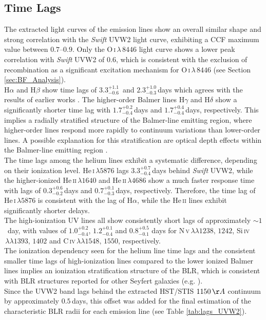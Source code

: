 \subsection{Time Lags}
The extracted light curves of the emission lines show an overall similar shape and strong correlation with the \textit{Swift} UVW2 light curve, exhibiting a CCF maximum value between $0.7$--$0.9$. Only the O\,\textsc{i}\,$\lambda\,8446$ light curve shows a lower peak correlation with \textit{Swift} UVW2 of $0.6$, which is consistent with the exclusion of recombination as a significant excitation mechanism for O\,\textsc{i}\,$\lambda\,8446$ (see Section \ref{sec:BF_Analysis}).\\
H$\alpha$ and H$\beta$ show time lags of $3.3^{+1.1}_{-0.6}\,$ and $2.3^{+1.0}_{-0.3}\,$days which agrees with the results of earlier works \parencite{kollatschny1997balmer, denney2006ngc4593, Williams_2018}. The higher-order Balmer lines H$\gamma$ and H$\delta$ show a significantly shorter time lag with $1.7^{+0.2}_{-0.4}\,$days and $1.7^{+0.4}_{-0.4}\,$days, respectively. This implies a radially stratified structure of the Balmer-line emitting region, where higher-order lines respond more rapidly to continuum variations than lower-order lines. A possible explanation for this stratification are optical depth effects within the Balmer-line emitting region \parencite{korista2004optical}. \\
The time lags among the helium lines exhibit a systematic difference, depending on their ionization level. He\,\textsc{i}$\,\lambda5876$ lags $3.3^{+0.7}_{-0.4}\,$days behind \textit{Swift} UVW2, while the higher-ionized He\,\textsc{ii}$\,\lambda1640$ and He\,\textsc{ii}$\,\lambda4686$ show a much faster response time with lags of $0.3^{+0.6}_{-0.2}\,$days and $0.7^{+0.1}_{-0.3}\,$days, respectively. Therefore, the time lag of He\,\textsc{i}$\,\lambda5876$ is consistent with the lag of H$\alpha$, while the He\,\textsc{ii} lines exhibit significantly shorter delays.\\
The high-ionization UV lines all show consistently short lags of approximately $\sim 1$\, day, with values of $1.0 \ensuremath{_{-0.4}^{+0.2}}$, $1.2 \ensuremath{_{-0.4}^{+0.1}}$ and $0.8 \ensuremath{_{-0.1}^{+0.5}}$ days for N\,\textsc{v}$\,\lambda\lambda 1238,\,1242$, Si\,\textsc{iv} $\,\lambda\lambda 1393,\,1402$ and C\,\textsc{iv}$\,\lambda\lambda 1548,\,1550$, respectively.\\ The ionization dependency seen for the helium line time lags and the consistent smaller time lags of high-ionization lines compared to the lower ionized Balmer lines implies an ionization stratification structure of the BLR, which is consistent with BLR structures reported for other Seyfert galaxies (e.g. \cite{collin1988broad, gaskell1986line, kollatschny2001short}).\\
Since the UVW2 band lags behind the extracted HST/STIS $1150\,\AA$ continuum by approximately $0.5\,$days, this offset was added for the final estimation of the characteristic BLR radii for each emission line (see Table \ref{tab:lags_UVW2}).



